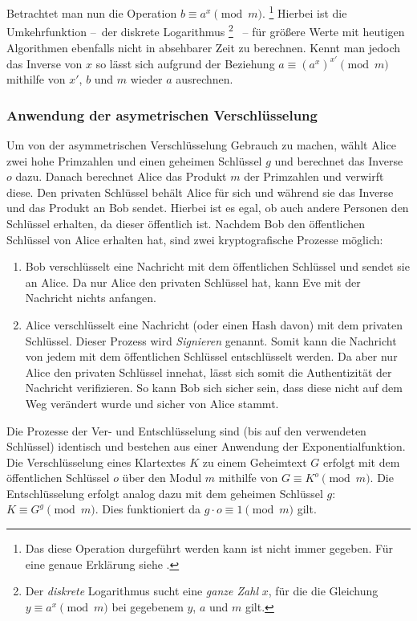 Betrachtet man nun die Operation $b \equiv a^x \pmod{m}$.%
\footnote{Das diese Operation durgeführt werden kann ist nicht immer gegeben. Für eine genaue Erklärung siehe \cite[157-160]{schmeh2007}.}
Hierbei ist die Umkehrfunktion --~der diskrete Logarithmus%
\footnote{Der \emph{diskrete} Logarithmus sucht eine \emph{ganze Zahl} $x$, für die die Gleichung $y \equiv a^x \pmod{m}$ bei gegebenem $y$, $a$ und $m$ gilt.}
~-- für größere Werte mit heutigen Algorithmen ebenfalls nicht in absehbarer Zeit zu berechnen.
Kennt man jedoch das Inverse von $x$ so lässt sich aufgrund der Beziehung $a \equiv (a^x)^{x'} \pmod{m}$ mithilfe von $x'$, $b$ und $m$ wieder $a$ ausrechnen.

\subsubsection{Anwendung der asymetrischen Verschlüsselung}

Um von der asymmetrischen Verschlüsselung Gebrauch zu machen, wählt Alice zwei hohe Primzahlen und einen geheimen Schlüssel $g$ und berechnet das Inverse $o$ dazu.
Danach berechnet Alice das Produkt $m$ der Primzahlen und verwirft diese.
Den privaten Schlüssel behält Alice für sich und während sie das Inverse und das Produkt an Bob sendet.
Hierbei ist es egal, ob auch andere Personen den Schlüssel erhalten, da dieser öffentlich ist.
Nachdem Bob den öffentlichen Schlüssel von Alice erhalten hat, sind zwei kryptografische Prozesse möglich:
\begin{enumerate}
    \item Bob verschlüsselt eine Nachricht mit dem öffentlichen Schlüssel und sendet sie an Alice.
    Da nur Alice den privaten Schlüssel hat, kann Eve mit der Nachricht nichts anfangen.
    \item Alice verschlüsselt eine Nachricht (oder einen Hash davon) mit dem privaten Schlüssel.
    Dieser Prozess wird \emph{Signieren} genannt.
    Somit kann die Nachricht von jedem mit dem öffentlichen Schlüssel entschlüsselt werden.
    Da aber nur Alice den privaten Schlüssel innehat, lässt sich somit die Authentizität der Nachricht verifizieren.
    So kann Bob sich sicher sein, dass diese nicht auf dem Weg verändert wurde und sicher von Alice stammt.
\end{enumerate}

Die Prozesse der Ver- und Entschlüsselung sind (bis auf den verwendeten Schlüssel) identisch und bestehen aus einer Anwendung der Exponentialfunktion.
Die Verschlüsselung eines Klartextes $K$ zu einem Geheimtext $G$ erfolgt mit dem öffentlichen Schlüssel $o$ über den Modul $m$ mithilfe von $G \equiv K^o \pmod{m}$.
Die Entschlüsselung erfolgt analog dazu mit dem geheimen Schlüssel $g$: $K \equiv G^g \pmod{m}$.
Dies funktioniert da $g \cdot o \equiv 1 \pmod{m}$ gilt.

